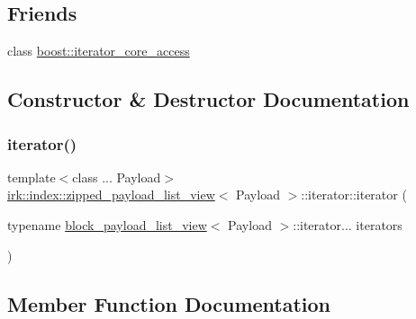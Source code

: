 \subsection*{Friends}
\begin{DoxyCompactItemize}
\item 
class \mbox{\hyperlink{classirk_1_1index_1_1zipped__payload__list__view_1_1iterator_ac09f73e325921cc50ebcd96bed0f8096}{boost\+::iterator\+\_\+core\+\_\+access}}
\end{DoxyCompactItemize}


\subsection{Constructor \& Destructor Documentation}
\mbox{\label{classirk_1_1index_1_1zipped__payload__list__view_1_1iterator_a469993754f092a3996e4de3c61411faf}} 
\subsubsection{\texorpdfstring{iterator()}{iterator()}}
{\footnotesize\ttfamily template$<$class ... Payload$>$ \\
\mbox{\hyperlink{classirk_1_1index_1_1zipped__payload__list__view}{irk\+::index\+::zipped\+\_\+payload\+\_\+list\+\_\+view}}$<$ Payload $>$\+::iterator\+::iterator (\begin{DoxyParamCaption}\item[{typename \mbox{\hyperlink{classirk_1_1index_1_1block__payload__list__view}{block\+\_\+payload\+\_\+list\+\_\+view}}$<$ Payload $>$\+::iterator...}]{iterators }\end{DoxyParamCaption})\hspace{0.3cm}{\ttfamily [inline]}}



\subsection{Member Function Documentation}
\mbox{\label{classirk_1_1index_1_1zipped__payload__list__view_1_1iterator_a66e4e30f467ffca4b6b4328d55bf7f60}} 

